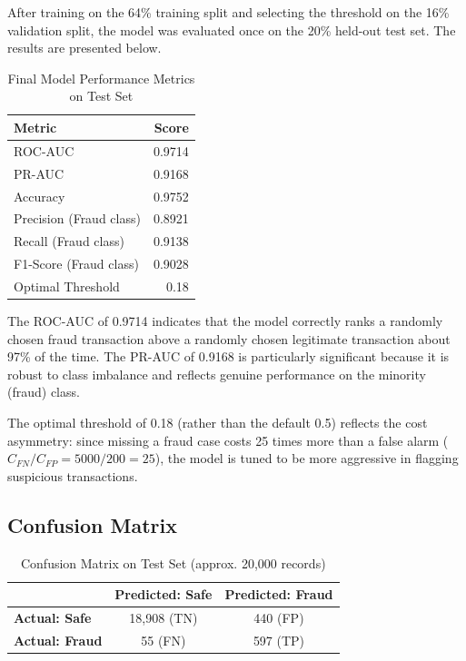 After training on the 64\% training split and selecting the threshold on the 16\% validation split, the model was evaluated once on the 20\% held-out test set. The results are presented below.

\begin{table}[H]
\centering
\caption{Final Model Performance Metrics on Test Set}
\label{tab:metrics}
\begin{tabular}{|l|r|}
\hline
\textbf{Metric} & \textbf{Score}\\
\hline
ROC-AUC & 0.9714\\
\hline
PR-AUC & 0.9168\\
\hline
Accuracy & 0.9752\\
\hline
Precision (Fraud class) & 0.8921\\
\hline
Recall (Fraud class) & 0.9138\\
\hline
F1-Score (Fraud class) & 0.9028\\
\hline
Optimal Threshold & 0.18\\
\hline
\end{tabular}
\end{table}

The ROC-AUC of 0.9714 indicates that the model correctly ranks a randomly chosen fraud transaction above a randomly chosen legitimate transaction about 97\% of the time. The PR-AUC of 0.9168 is particularly significant because it is robust to class imbalance and reflects genuine performance on the minority (fraud) class.

The optimal threshold of 0.18 (rather than the default 0.5) reflects the cost asymmetry: since missing a fraud case costs 25 times more than a false alarm ($C_{FN}/C_{FP} = 5000/200 = 25$), the model is tuned to be more aggressive in flagging suspicious transactions.

\subsection{Confusion Matrix}

\begin{table}[H]
\centering
\caption{Confusion Matrix on Test Set (approx. 20,000 records)}
\label{tab:confusion}
\begin{tabular}{|l|c|c|}
\hline
 & \textbf{Predicted: Safe} & \textbf{Predicted: Fraud}\\
\hline
\textbf{Actual: Safe} & 18,908 (TN) & 440 (FP)\\
\hline
\textbf{Actual: Fraud} & 55 (FN) & 597 (TP)\\
\hline
\end{tabular}
\end{table}

